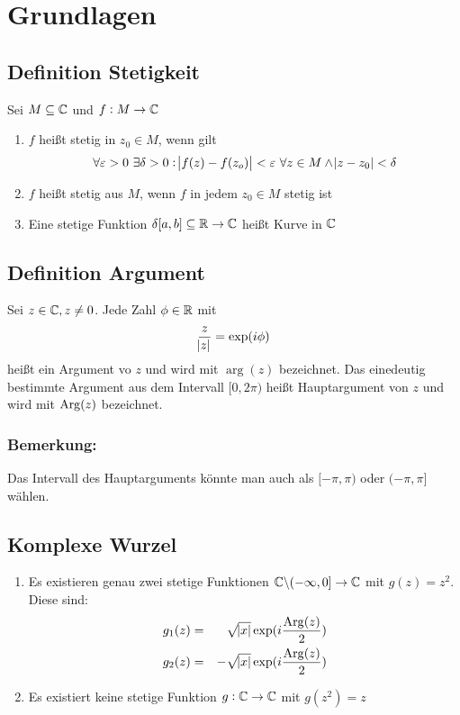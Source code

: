 \section{Grundlagen}
\subsection{Definition Stetigkeit}
Sei $M\subseteq\mathbb{C}$ und $f: M \to \mathbb{C}$
\begin{enumerate}
    \item $f$ heißt stetig in $z_0 \in M$, wenn gilt
        \begin{equation*}
            \forall \varepsilon > 0\ \exists \delta > 0: \abs{f(z) - f(z_o)} < \varepsilon\ \forall z \in M
            \land \abs{z-z_0} < \delta
        \end{equation*}
    \item $f$ heißt stetig aus $M$, wenn $f$ in jedem $z_0 \in M$ stetig ist
    \item Eine stetige Funktion $\delta[a,b] \subseteq \mathbb{R} \to \mathbb{C}$ heißt Kurve in $\mathbb{C}$
\end{enumerate}

\subsection{Definition Argument}
Sei $z \in \mathbb{C}, z \neq 0$. Jede Zahl $\phi \in \mathbb{R}$ mit
\begin{equation*}
    \frac{z}{\abs{z}} = \exp(i \phi)
\end{equation*}
heißt ein Argument vo $z$ und wird mit $\arg(z)$ bezeichnet. Das einedeutig bestimmte Argument aus dem Intervall
$[0, 2\pi)$ heißt Hauptargument von $z$ und wird mit $\operatorname{Arg}(z)$ bezeichnet.

\subsubsection{Bemerkung:}
Das Intervall des Hauptarguments könnte man auch als $[-\pi, \pi)$ oder $(-\pi, \pi]$ wählen.

\subsection{Komplexe Wurzel}
\begin{enumerate}
    \item Es existieren genau zwei stetige Funktionen $\mathbb{C}\backslash(-\infty, 0] \to \mathbb{C}$ mit $g(z) = z^2$.
        Diese sind:
        \begin{eqnarray*}
            g_1(z) &=& \sqrt{\abs{x}} \exp(i \frac{\operatorname{Arg}(z)}{2}) \\
            g_2(z) &=& -\sqrt{\abs{x}} \exp(i \frac{\operatorname{Arg}(z)}{2}) 
        \end{eqnarray*}
    \item Es existiert keine stetige Funktion $g: \mathbb{C} \to \mathbb{C}$ mit $g(z^2) = z$
\end{enumerate}

